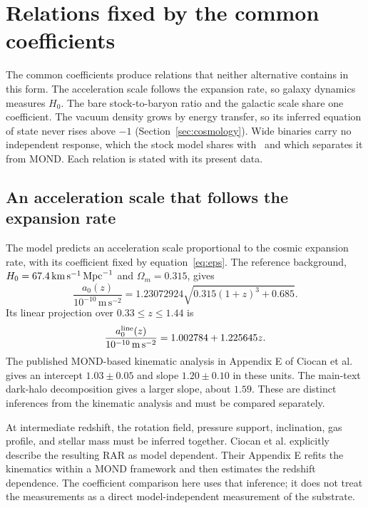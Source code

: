 \section{Relations fixed by the common coefficients}
\label{sec:predictions}
\label{sec:discriminants}

The common coefficients produce relations that neither alternative
contains in this form. The acceleration scale follows the expansion rate, so galaxy
dynamics measures $H_0$. The bare stock-to-baryon ratio and the galactic
scale share one coefficient. The vacuum density grows by energy transfer,
so its inferred equation of state never rises above $-1$
(Section~\ref{sec:cosmology}). Wide binaries carry no independent
response, which the stock model shares with \LCDM\ and which separates it
from MOND. Each relation is stated with its present data.

\subsection{An acceleration scale that follows the expansion rate}
\label{sec:redshift}

The model predicts an acceleration scale proportional to the cosmic
expansion rate, with its coefficient fixed by equation~\eqref{eq:eps}.
The reference background, $H_0=67.4\,\mathrm{km\,s^{-1}}\,\mathrm{Mpc}^{-1}$ and
$\Omega_m=0.315$, gives
\begin{equation}
\frac{a_0(z)}{10^{-10}\,\mathrm{m\,s^{-2}}}
=1.23072924\sqrt{0.315(1+z)^3+0.685}.
\label{eq:aznumeric}
\end{equation}
Its linear projection over $0.33\le z\le1.44$ is
\begin{equation}
\frac{a_0^{\rm line}(z)}{10^{-10}\,\mathrm{m\,s^{-2}}}
=1.002784+1.225645z.
\label{eq:projection}
\end{equation}
The published MOND-based kinematic analysis in Appendix E of
Ciocan et al. gives an intercept $1.03\pm0.05$ and slope
$1.20\pm0.10$ in these units. The main-text dark-halo decomposition gives a
larger slope, about $1.59$. These are distinct inferences from the
kinematic analysis and must be compared separately. \cite{ciocan}

At intermediate redshift, the rotation field, pressure support, inclination,
gas profile, and stellar mass must be inferred together. Ciocan et al.
explicitly describe the resulting RAR as model dependent. Their Appendix E
refits the kinematics within a MOND framework and then estimates the
redshift dependence. The coefficient comparison here uses that inference;
it does not treat the measurements as a direct model-independent
measurement of the substrate. \cite{ciocan}

